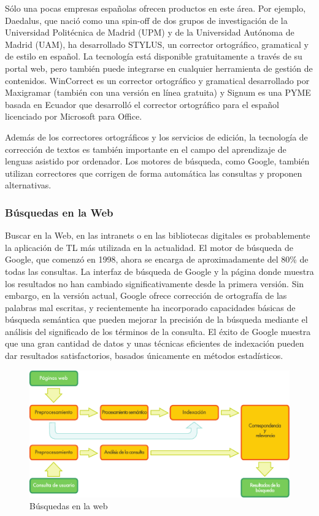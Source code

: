 \begin{multicols}{2}
Sólo una pocas empresas españolas ofrecen productos en este área. Por ejemplo, Daedalus, que nació como una spin-off de dos grupos de investigación de la Universidad Politécnica de Madrid (UPM) y de la Universidad Autónoma de Madrid (UAM), ha desarrollado STYLUS, un corrector ortográfico, gramatical y de estilo en español. La tecnología está disponible gratuitamente a través de su portal web, pero también puede integrarse en cualquier herramienta de gestión de contenidos. WinCorrect es un corrector ortográfico y gramatical desarrollado por Maxigramar (también con una versión en línea gratuita) y Signum es una PYME basada en Ecuador que desarrolló el corrector ortográfico para el español licenciado por Microsoft para Office.

Además de los correctores ortográficos y los servicios de edición, la tecnología de corrección de textos es también importante en el campo del aprendizaje de lenguas asistido por ordenador. Los motores de búsqueda, como Google, también utilizan correctores que corrigen de forma automática las consultas y proponen alternativas.

\subsubsection{Búsquedas en la Web}

Buscar en la Web, en las intranets o en las bibliotecas digitales es probablemente la aplicación de TL más utilizada en la actualidad. El motor de búsqueda de Google, que comenzó en 1998, ahora se encarga de aproximadamente del 80\% de todas las consultas. La interfaz de búsqueda de Google y la página donde muestra los resultados no han cambiado significativamente desde la primera versión. Sin embargo, en la versión actual, Google ofrece corrección de ortografía de las palabras mal escritas, y recientemente ha incorporado capacidades básicas de búsqueda semántica que pueden mejorar la precisión de la búsqueda mediante el análisis del significado de los términos de la consulta. El éxito de Google muestra que una gran cantidad de datos y unas técnicas eficientes de indexación pueden dar resultados satisfactorios, basados únicamente en métodos estadísticos.

\begin{figure}[htb]
  \center
  \includegraphics[width=\textwidth]{../_media/spanish/web_search_architecture}
  \caption{Búsquedas en la web}
  \label{fig:websearcharch_de}
\end{figure}


\end{multicols}
